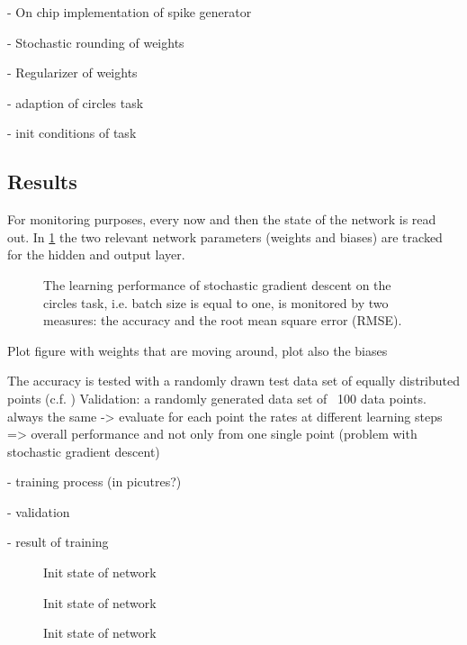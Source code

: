 - On chip implementation of spike generator

- Stochastic rounding of weights

- Regularizer of weights

- adaption of circles task 

- init conditions of task





\subsection{Results}

For monitoring purposes, every now and then the state of the network is read out. In \cref{network_monitoring} the two relevant network parameters (weights and biases) are tracked for the hidden and output layer.

\begin{figure}
	\centering
	\label{network_monitoring}
    
	\caption{The learning performance of stochastic gradient descent on the circles task, i.e. batch size is equal to one, is monitored by two measures: the accuracy and the root mean square error (RMSE).}
\end{figure}



Plot figure with weights that are moving around, plot also the biases

The accuracy is tested with a randomly drawn test data set of equally distributed points (c.f. )
Validation:
a randomly generated data set of ~100 data points. always the same -> evaluate for each point the rates at different learning steps => overall performance and not only from one single point (problem with stochastic gradient descent)

- training process (in picutres?)

- validation

- result of training
\begin{figure}
	\label{learning_process_s5}
	
	\caption{Init state of network}
\end{figure}
\begin{figure}
	\label{learning_process_s500}
	
	\caption{Init state of network}
\end{figure}
\begin{figure}
	\label{learning_process_s2500}
	
	\caption{Init state of network}
\end{figure}


